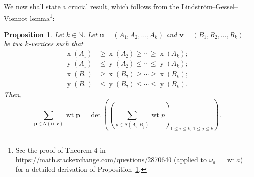 \documentclass[reqno]{amsart}
\newcommand{\0}{\phantom{c}}
\let\sumnonlimits\sum
\renewcommand{\sum}{\sumnonlimits\limits}
\theoremstyle{plain}
\newtheorem{prop}[thm]{Proposition}
\theoremstyle{definition}
\numberwithin{equation}{section}
\begin{document}
We now shall state a crucial result, which follows from the
Lindstr\"om--Gessel--Viennot lemma\footnote{See the proof of Theorem 4 in
\url{https://math.stackexchange.com/questions/2870640} (applied to $\omega_{a}
= \operatorname{wt} a$) for a detailed derivation of
Proposition~\ref{prop.LGV.concrete}.}:

\begin{prop}
\label{prop.LGV.concrete}Let $k\in\mathbb{N}$. Let $\mathbf{u}=\left(
A_{1},A_{2},\ldots,A_{k}\right)  $ and $\mathbf{v}=\left(  B_{1},B_{2}%
,\ldots,B_{k}\right)  $ be two $k$-vertices such that%
\begin{align*}
\operatorname*{x}\left(  A_{1}\right)   &  \geq\operatorname*{x}\left(
A_{2}\right)  \geq\cdots\geq\operatorname*{x}\left(  A_{k}\right)  ;\\
\operatorname*{y}\left(  A_{1}\right)   &  \leq\operatorname*{y}\left(
A_{2}\right)  \leq\cdots\leq\operatorname*{y}\left(  A_{k}\right)  ;\\
\operatorname*{x}\left(  B_{1}\right)   &  \geq\operatorname*{x}\left(
B_{2}\right)  \geq\cdots\geq\operatorname*{x}\left(  B_{k}\right)  ;\\
\operatorname*{y}\left(  B_{1}\right)   &  \leq\operatorname*{y}\left(
B_{2}\right)  \leq\cdots\leq\operatorname*{y}\left(  B_{k}\right)  .
\end{align*}
Then,%
\[
\sum_{\mathbf{p}\in N\left(  \mathbf{u},\mathbf{v}\right)  }\operatorname*{wt}%
\mathbf{p}=\det\left(  \left(  \sum_{p\in N\left(  A_{i},B_{j}\right)
}\operatorname*{wt}p\right)  _{1\leq i\leq k,\ 1\leq j\leq k}\right)  .
\]

\end{prop}
\end{document}
